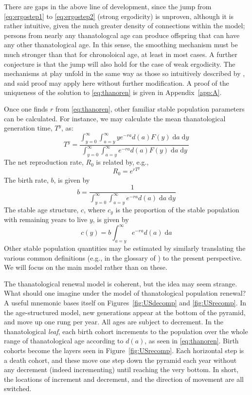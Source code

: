 \documentclass{article}
\newcommand{\dd}{\; \mathrm{d}}
\begin{document}
There are gaps in the above line of development, since the jump from
\eqref{eq:ergostep1} to \eqref{eq:ergostep2} (strong ergodicity) is unproven,
although it is rather intuitive, given the much greater density of connections
within the model; persons from nearly any thanatologcal age can produce
offspring that can have any other thanatological age. In this sense, the
smoothing mechanism must be much stronger than that for chronoloical age, at
least in most cases. A further conjecture is that the jump will also hold for
the case of weak ergodicity. The mechanisms at play unfold in the same way as those so intuitively described by \citet{arthur1982ergodic}, and said proof may apply here without further modification. A proof of the uniqueness of the solution to \eqref{eq:thanoren} is given in Appendix~\ref{app:A}.

Once one finds $r$ from \eqref{eq:thanoren}, other familiar stable population
parameters can be calculated. For instance, we may calculate the mean
thanatological generation time, $T^y$, as:
\begin{equation}
\label{eq:Ty}
 T^y =  \frac{\int _{y=0}^\infty \int _{a=y}^\infty y e^{-ra} d(a) F(y) \dd a
\dd y}{\int _{y=0}^\infty \int _{a=y}^\infty e^{-ra} d(a) F(y) \dd a \dd y}
\end{equation}
The net reproduction rate, $R_0$ is related by, e.g.,
\begin{equation}
\label{eq:R0fromTy}
R_0 = e^{r T^y}
\end{equation}
The birth rate, $b$, is given by
\begin{equation}
\label{eq:eybrate}
b = \frac{1}{\int _{y=0}^\infty \int _{a=y}^\infty e^{-ra} d(a) \dd a
\dd y}
\end{equation}
The stable age structure, $c$, where $c_y$ is the
proportion of the stable population with remaining years to live $y$, is given
by
\begin{equation}
\label{eq:cy}
c(y) = b \int _{a=y}^\infty e^{-ra} d(a) \dd a
\end{equation}
Other stable population quantities may be estimated by similarly translating the
various common definitions (e.g., in the glossary of \citet{coale1972growth}) to
the present perspective. We will focus on the main model rather than on these.

The thanatological renewal model is coherent, but the idea may seem strange.
What should one imagine under the model of thanatological population renewal? 
A useful mnemonic bases itself on Figures~\ref{fig:USdecomp} and
\ref{fig:USrecomp}. In the age-structured model, new generations
appear at the bottom of the pyramid, and move up one rung per year. All ages 
are subject to decrement. In the thanatological \textit{leaf}, each birth cohort increments to
the population over the whole range of thanatological age according to $d(a)$,
as seen in \eqref{eq:thanoren}. Birth cohorts become the layers seen in
Figure~\ref{fig:USrecomp}. Each horizontal step is a death cohort, and these
move one step down the pyramid each year without any decrement (indeed
incrementing) until reaching the very bottom. In short, the locations of
increment and decrement, and the direction of movement are all switched.
\end{document}
